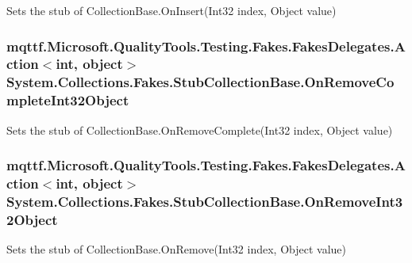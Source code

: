 Sets the stub of Collection\-Base.\-On\-Insert(\-Int32 index, Object value)

\hypertarget{class_system_1_1_collections_1_1_fakes_1_1_stub_collection_base_a4501f32291ae35262dae045c9860f6f1}{
\subsubsection[{On\-Remove\-Complete\-Int32\-Object}]{\setlength{\rightskip}{0pt plus 5cm}mqttf.\-Microsoft.\-Quality\-Tools.\-Testing.\-Fakes.\-Fakes\-Delegates.\-Action$<$int, object$>$ System.\-Collections.\-Fakes.\-Stub\-Collection\-Base.\-On\-Remove\-Complete\-Int32\-Object}}\label{class_system_1_1_collections_1_1_fakes_1_1_stub_collection_base_a4501f32291ae35262dae045c9860f6f1}


Sets the stub of Collection\-Base.\-On\-Remove\-Complete(\-Int32 index, Object value)

\hypertarget{class_system_1_1_collections_1_1_fakes_1_1_stub_collection_base_a38cca795c68d797cac96d00809f511a4}{
\subsubsection[{On\-Remove\-Int32\-Object}]{\setlength{\rightskip}{0pt plus 5cm}mqttf.\-Microsoft.\-Quality\-Tools.\-Testing.\-Fakes.\-Fakes\-Delegates.\-Action$<$int, object$>$ System.\-Collections.\-Fakes.\-Stub\-Collection\-Base.\-On\-Remove\-Int32\-Object}}\label{class_system_1_1_collections_1_1_fakes_1_1_stub_collection_base_a38cca795c68d797cac96d00809f511a4}


Sets the stub of Collection\-Base.\-On\-Remove(\-Int32 index, Object value)

